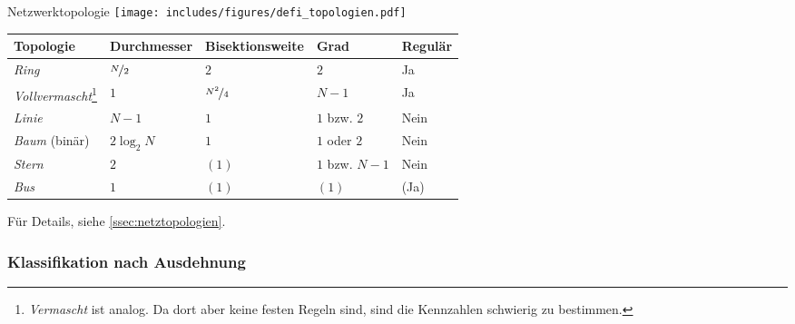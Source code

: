 \begin{defi}{Netzwerktopologie}
    \centering
    \texttt{[image: includes/figures/defi\_topologien.pdf]}

    \begin{tabularx}{\textwidth}{|X|l|l|l|l|}
        \hline
        Topologie                                                                                                                                      & Durchmesser       & Bisektionsweite     & Grad           & Regulär \\
        \hline \hline
        \emph{Ring}                                                                                                                                    & $\nicefrac{N}{2}$ & $2$                 & $2$            & Ja      \\
        \hline
        \emph{Vollvermascht}\footnote{\emph{Vermascht} ist analog. Da dort aber keine festen Regeln sind, sind die Kennzahlen schwierig zu bestimmen.} & $1$               & $\nicefrac{N^2}{4}$ & $N-1$          & Ja      \\
        \hline
        \emph{Linie}                                                                                                                                   & $N-1$             & $1$                 & $1$ bzw. $2$   & Nein    \\
        \hline
        \emph{Baum} (binär)                                                                                                                            & $2 \log_2 N$      & $1$                 & $1$ oder $2$   & Nein    \\
        \hline
        \emph{Stern}                                                                                                                                   & $2$               & $(1)$               & $1$ bzw. $N-1$ & Nein    \\
        \hline
        \emph{Bus}                                                                                                                                     & $1$               & $(1)$               & $(1)$          & (Ja)    \\
        \hline
    \end{tabularx}

    Für Details, siehe \ref{ssec:netztopologien}.
\end{defi}

\subsubsection{Klassifikation nach Ausdehnung}

